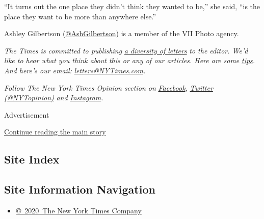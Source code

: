 ``It turns out the one place they didn't think they wanted to be,'' she
said, ``is the place they want to be more than anywhere else.''

Ashley Gilbertson
(\href{https://twitter.com/ashgilbertson?lang=en}{@AshGilbertson}) is a
member of the VII Photo agency.

\emph{The Times is committed to publishing}
\href{https://www.nytimes3xbfgragh.onion/2019/01/31/opinion/letters/letters-to-editor-new-york-times-women.html}{\emph{a
diversity of letters}} \emph{to the editor. We'd like to hear what you
think about this or any of our articles. Here are some}
\href{https://help.nytimes3xbfgragh.onion/hc/en-us/articles/115014925288-How-to-submit-a-letter-to-the-editor}{\emph{tips}}\emph{.
And here's our email:}
\href{mailto:letters@NYTimes.com}{\emph{letters@NYTimes.com}}\emph{.}

\emph{Follow The New York Times Opinion section on}
\href{https://www.facebookcorewwwi.onion/nytopinion}{\emph{Facebook}}\emph{,}
\href{http://twitter.com/NYTOpinion}{\emph{Twitter (@NYTopinion)}}
\emph{and}
\href{https://www.instagram.com/nytopinion/}{\emph{Instagram}}\emph{.}

Advertisement

\protect\hyperlink{after-bottom}{Continue reading the main story}

\hypertarget{site-index}{%
\subsection{Site Index}\label{site-index}}

\hypertarget{site-information-navigation}{%
\subsection{Site Information
Navigation}\label{site-information-navigation}}

\begin{itemize}
\tightlist
\item
  \href{https://help.nytimes3xbfgragh.onion/hc/en-us/articles/115014792127-Copyright-notice}{©~2020~The
  New York Times Company}
\end{itemize}

